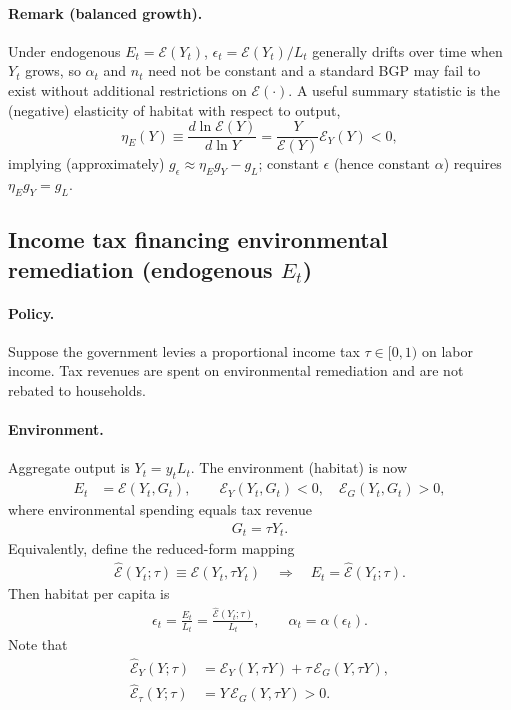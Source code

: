 \documentclass[11pt]{article}
\begin{document}
\paragraph{Remark (balanced growth).}
Under endogenous $E_t=\mathcal{E}(Y_t)$, $\epsilon_t=\mathcal{E}(Y_t)/L_t$ generally drifts over time when $Y_t$ grows,
so $\alpha_t$ and $n_t$ need not be constant and a standard BGP may fail to exist without additional restrictions on $\mathcal{E}(\cdot)$.
A useful summary statistic is the (negative) elasticity of habitat with respect to output,
\[
\eta_E(Y)\equiv \frac{d\ln \mathcal{E}(Y)}{d\ln Y}=\frac{Y}{\mathcal{E}(Y)}\mathcal{E}_Y(Y)<0,
\]
implying (approximately) $g_{\epsilon}\approx \eta_E g_Y - g_L$; constant $\epsilon$ (hence constant $\alpha$) requires $\eta_E g_Y = g_L$.
\subsection{Income tax financing environmental remediation (endogenous $E_t$)}

\paragraph{Policy.}
Suppose the government levies a proportional income tax $\tau\in[0,1)$ on labor income.
Tax revenues are spent on environmental remediation and are not rebated to households.

\paragraph{Environment.}
Aggregate output is $Y_t=y_tL_t$. The environment (habitat) is now
\begin{align}
E_t &= \mathcal{E}(Y_t,G_t),
\qquad 
\mathcal{E}_Y(Y_t,G_t)<0,\quad \mathcal{E}_G(Y_t,G_t)>0,
\label{eq:E_tax_general}
\end{align}
where environmental spending equals tax revenue
\begin{align}
G_t = \tau Y_t.
\label{eq:G_tax}
\end{align}
Equivalently, define the reduced-form mapping
\begin{align}
\widehat{\mathcal{E}}(Y_t;\tau)\equiv \mathcal{E}(Y_t,\tau Y_t)
\quad\Rightarrow\quad
E_t=\widehat{\mathcal{E}}(Y_t;\tau).
\label{eq:Ehat}
\end{align}
Then habitat per capita is
\begin{align}
\epsilon_t=\frac{E_t}{L_t}
=\frac{\widehat{\mathcal{E}}(Y_t;\tau)}{L_t},
\qquad
\alpha_t=\alpha(\epsilon_t).
\label{eq:eps_alpha_tax}
\end{align}
Note that
\begin{align}
\widehat{\mathcal{E}}_Y(Y;\tau)
&=\mathcal{E}_Y(Y,\tau Y)+\tau\,\mathcal{E}_G(Y,\tau Y),
\label{eq:Ehat_Y}\\
\widehat{\mathcal{E}}_\tau(Y;\tau)
&=Y\,\mathcal{E}_G(Y,\tau Y)>0.
\label{eq:Ehat_tau}
\end{align}
\end{document}
